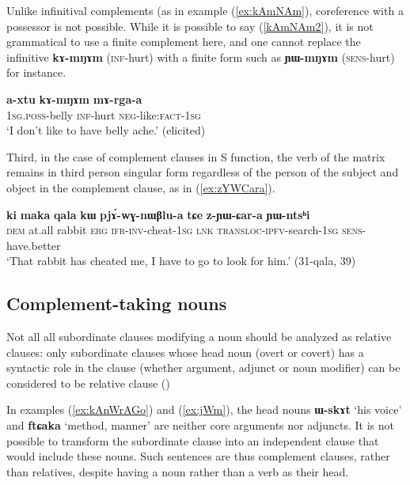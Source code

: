 \documentclass[oneside,a4paper,11pt]{article}
\newcommand{\ipa}[1]{\textbf{\phon#1}} %
\newcommand{\jpg}[2]{\ipa{#1} `#2'} %
\newcommand{\refb}[1]{(\ref{#1})}
\begin{document}
Unlike infinitival complements (as in example (\ref{ex:kAmNAm}), coreference with a possessor is not possible. While it is possible to say (\ref{kAmNAm2}), it is not grammatical to use a finite complement here, and one cannot replace the infinitive \ipa{kɤ-mŋɤm} (\textsc{inf}-hurt) with a finite form such as \ipa{ɲɯ-mŋɤm} (\textsc{sens}-hurt) for instance.

\begin{exe}
\ex \label{kAmNAm2}
\gll \ipa{a-xtu} \ipa{kɤ-mŋɤm} \ipa{mɤ-rga-a} \\
\textsc{1sg.poss}-belly \textsc{inf}-hurt \textsc{neg}-like:\textsc{fact-1sg} \\
\glt `I don't like to have belly ache.' (elicited)
\end{exe}

Third, in the case of complement clauses in S function, the verb of the matrix remains in third person singular form regardless of the person of the subject and object in the complement clause, as in (\ref{ex:zYWCara}).

\begin{exe}
\ex \label{ex:zYWCara}
\gll \ipa{ki} 	\ipa{maka} 	\ipa{qala} 	\ipa{kɯ} 	\ipa{pjɤ́-wɣ-nɯβlu-a} 	\ipa{tɕe} 	\ipa{z-ɲɯ-ɕar-a} 	\ipa{ɲɯ-ntsʰi}\\ 
\textsc{dem} at.all rabbit \textsc{erg} \textsc{ifr-inv}-cheat-\textsc{1sg} \textsc{lnk} \textsc{transloc-ipfv}-search-\textsc{1sg} \textsc{sens}-have.better \\
\glt `That rabbit has cheated me, I have to go to look for him.' (31-qala, 39)
\end{exe}

\subsection{Complement-taking nouns} \label{sec:comp.noun}
 Not all all subordinate clauses modifying a noun should be analyzed as relative clauses: only subordinate clauses whose head noun (overt or covert) has a syntactic role in the clause (whether argument, adjunct or noun modifier) can be considered to be relative clause (\citealt{jackson06guanxiju, jacques16relatives})

 In examples \refb{ex:kAnWrAGo} and \refb{ex:jWm}, the head nouns \jpg{ɯ-skɤt}{his voice} and \jpg{ftɕaka}{method, manner} are neither core arguments nor adjuncts. It is not possible to transform the subordinate clause into an independent clause that would include these nouns. Such sentences are thus complement clauses, rather than relatives, despite having a noun rather than a verb as their head.
\end{document}
